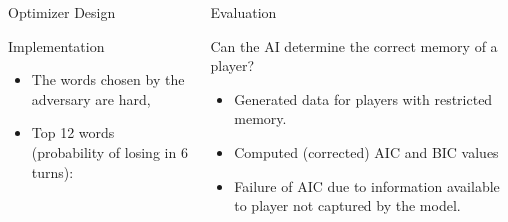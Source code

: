 \documentclass[final]{beamer}
\begin{document}
{\begin{frame}{}
\begin{center}
\begin{columns}[t]
\begin{column}{0.32\textwidth}
\begin{block}{\huge Optimizer Design}
\vspace{.7cm}




\end{block}

\vspace{1.5cm}

    \begin{block}{\huge Implementation}

\vspace{.5cm}
\begin{itemize}
\item The words chosen by the adversary are hard,
\item Top 12 words {\color{orange}(probability of losing in 6 turns)}:
\end{itemize}

    \end{block}


\end{column}

\begin{column}{0.32\textwidth}

       \begin{block}{\huge Evaluation}

\vspace{1cm}
{\Large Can the AI determine the correct memory of a player?}
\begin{itemize}
\item Generated data for players with restricted memory.
\item Computed (corrected) AIC and BIC values
\item Failure of AIC due to information available to player not captured by the model.
\end{itemize}


\end{block}
\end{column}
\end{columns}
\end{center}
\end{frame}}
\end{document}
